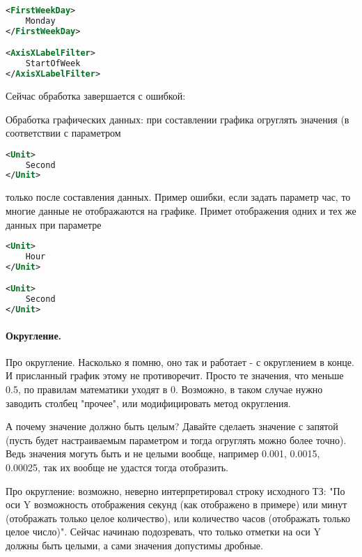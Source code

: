 \documentclass[10pt,a4paper]{article}
\begin{document}
\begin{lstlisting}[language=XML,label=MSSQLServerAuditor.GraphParameters.xml,caption=MSSQLServerAuditor.GraphParameters.xml]
<FirstWeekDay>
	Monday
</FirstWeekDay>

<AxisXLabelFilter>
	StartOfWeek
</AxisXLabelFilter>
\end{lstlisting}

Сейчас обработка завершается с ошибкой:

Обработка графических данных: при составлении графика огруглять значения (в
соответствии с параметром

\begin{lstlisting}[language=XML,label=MSSQLServerAuditor.GraphUnitParameters.Seconds.xml,caption=MSSQLServerAuditor.GraphUnitParameters.Seconds.xml]
<Unit>
	Second
</Unit>
\end{lstlisting}

только после составления данных. Пример ошибки, если задать параметр час, то
многие данные не отображаются на графике. Примет отображения одних и тех же
данных при параметре

\begin{lstlisting}[language=XML,label=MSSQLServerAuditor.GraphUnitParameters.xml,caption=MSSQLServerAuditor.GraphUnitParameters.xml]
<Unit>
	Hour
</Unit>

<Unit>
	Second
</Unit>
\end{lstlisting}

\paragraph{Округление.}

Про округление. Насколько я помню, оно так и работает - с округлением в конце. И
присланный график этому не противоречит. Просто те значения, что меньше 0.5, по
правилам математики уходят в 0. Возможно, в таком случае нужно заводить столбец
"прочее", или модифицировать метод округления.

А почему значение должно быть целым? Давайте сделаеть значение с запятой (пусть
будет настраиваемым параметром и тогда огруглять можно более точно). Ведь
значения могуть быть и не целыми вообще, например 0.001, 0.0015, 0.00025, так их
вообще не удастся тогда отобразить.

Про округление: возможно, неверно интерпретировал строку исходного ТЗ: "По оси Y
возможность отображения секунд (как отображено в примере) или минут (отображать
только целое количество), или количество часов (отображать только целое число)".
Сейчас начинаю подозревать, что только отметки на оси Y должны быть целыми, а
сами значения допустимы дробные.
\end{document}

